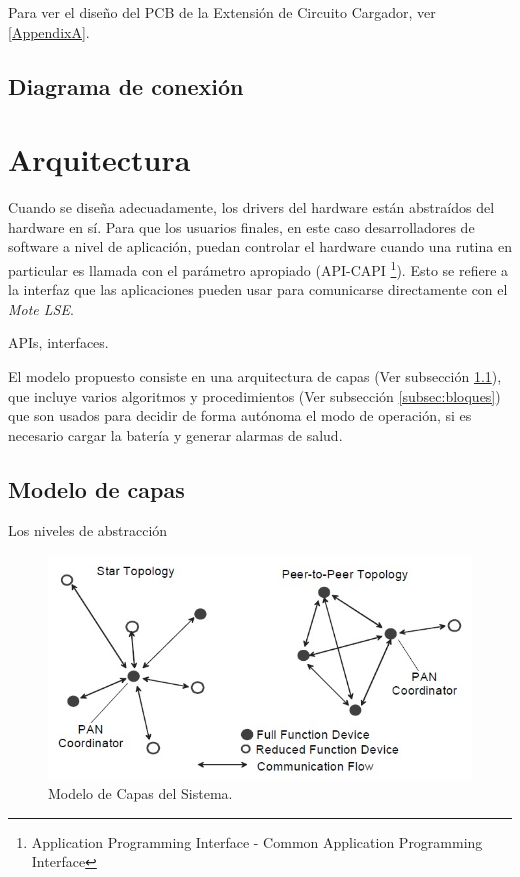 Para ver el diseño del PCB de la Extensión de Circuito Cargador, ver \ref{AppendixA}.
\subsection{Diagrama de conexión}
\label{subsec:conexión}


\section{Arquitectura}
\label{sec:arq}
Cuando se diseña adecuadamente, los drivers del hardware están abstraídos del hardware en sí. Para que los usuarios finales, en este caso desarrolladores de software a nivel de aplicación, puedan controlar el hardware cuando una rutina en particular es llamada con el parámetro apropiado (API-CAPI \footnote{Application Programming Interface - Common Application Programming Interface}). Esto se refiere a la interfaz que las aplicaciones pueden usar para comunicarse directamente con el \textit{Mote LSE}.

APIs, interfaces.

El modelo propuesto consiste en una arquitectura de capas (Ver subsección \ref{subsec:capas}), que incluye varios algoritmos y procedimientos (Ver subsección \ref{subsec:bloques}) que son usados para decidir de forma autónoma el modo de operación, si es necesario cargar la batería y generar alarmas de salud.

\subsection{Modelo de capas}
\label{subsec:capas} 
Los niveles de abstracción 
\begin{figure}[h!]
	\centering
    \includegraphics[width=.8\textwidth]{./Figures/topologia.jpg}
    	\caption{Modelo de Capas del Sistema.}
	\label{fig:capas}
\end{figure}
